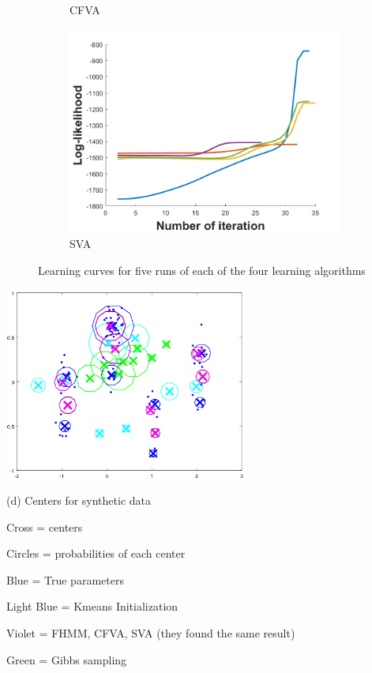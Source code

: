 \documentclass[10pt,a4paper]{report}
\begin{document}
\begin{figure}[ht]
\begin{subfigure}[b]{0.5\linewidth}
    \caption{CFVA} 
    \label{fig7:c} 
  \end{subfigure}%
  \begin{subfigure}[b]{0.5\linewidth}
    \centering
    \includegraphics[width=0.75\linewidth]{init_sva.png} 
    \caption{SVA} 
    \label{fig7:d} 
  \end{subfigure} 
  \caption{Learning curves for five runs of each of the four learning algorithms}
  \label{fig7} 
\end{figure}

\begin{minipage}{0.55\linewidth}
		\centering
		\includegraphics[width=0.6\textwidth]{fig11.png}
		\centerline{\large{(d) Centers for synthetic data}}
		\label{fig:c}
	
\end{minipage}\hfill
\begin{minipage}{0.4\linewidth}
		\normalsize{
			Cross = centers
			
			Circles = probabilities of each center
			
			Blue = True parameters
			
			Light Blue = Kmeans Initialization
			
			Violet = FHMM, CFVA, SVA (they found the same result)
			
			Green = Gibbs sampling
		}
\end{minipage}
\end{document}
